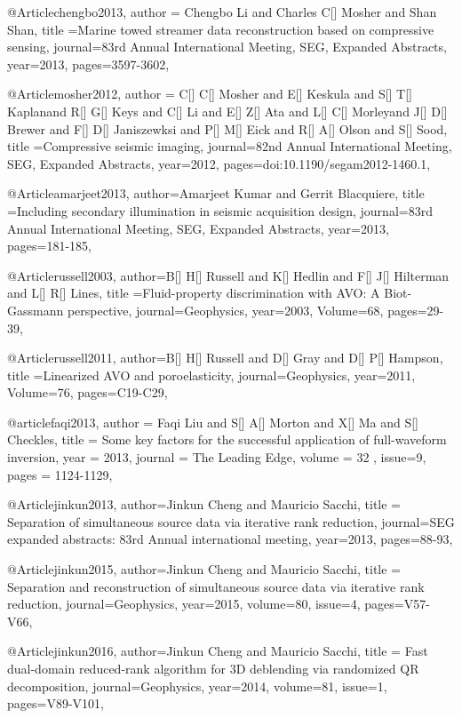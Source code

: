 {@Article{chengbo2013,
  author = {Chengbo Li and Charles C[] Mosher and Shan Shan},
  title ={Marine towed streamer data reconstruction based on compressive sensing},
  journal={83rd Annual International Meeting, SEG, Expanded Abstracts},
  year=2013,
  pages={3597-3602},
}

@Article{mosher2012,
  author = {C[] C[] Mosher and E[] Keskula and S[] T[] Kaplanand R[] G[] Keys and C[] Li and E[] Z[] Ata and L[] C[] Morleyand J[] D[] Brewer and F[] D[] Janiszewksi and P[] M[] Eick and R[] A[] Olson and S[] Sood},
  title ={Compressive seismic imaging},
  journal={82nd Annual International Meeting, SEG, Expanded Abstracts},
  year=2012,
  pages={doi:10.1190/segam2012-1460.1},
}


@Article{amarjeet2013,
  author={Amarjeet Kumar and Gerrit Blacquiere},
  title ={Including secondary illumination in seismic acquisition design},
  journal={83rd Annual International Meeting, SEG, Expanded Abstracts},
  year=2013,
  pages={181-185},
}

@Article{russell2003,
  author={B[] H[] Russell and K[] Hedlin and F[] J[] Hilterman and L[] R[] Lines},
  title ={Fluid-property discrimination with AVO: A Biot-Gassmann perspective},
  journal={Geophysics},
  year=2003,
  Volume=68,
  pages={29-39},
}

@Article{russell2011,
  author={B[] H[] Russell and D[] Gray and D[] P[] Hampson},
  title ={Linearized AVO and poroelasticity},
  journal={Geophysics},
  year=2011,
  Volume=76,
  pages={C19-C29},
}

@article{faqi2013,
  author =	 {Faqi Liu and S[] A[] Morton and X[] Ma and S[] Checkles},
  title =	 {Some key factors for the successful application of full-waveform inversion},
  year =	 2013,
  journal =	 {The Leading Edge},
  volume = 32	 ,
  issue=9,
  pages =	 {1124-1129},
}


@Article{jinkun2013,
  author={Jinkun Cheng and Mauricio Sacchi},
  title = {Separation of simultaneous source data via iterative rank reduction},
  journal={SEG expanded abstracts: 83rd Annual international meeting},
  year=2013,
  pages={88-93},
}

@Article{jinkun2015,
  author={Jinkun Cheng and Mauricio Sacchi},
  title = {Separation and reconstruction of simultaneous source data via iterative rank reduction},
  journal={Geophysics},
  year=2015,
  volume=80,
  issue=4,
  pages={V57-V66},
}

@Article{jinkun2016,
  author={Jinkun Cheng and Mauricio Sacchi},
  title = {Fast dual-domain reduced-rank algorithm for 3{D} deblending via randomized QR decomposition},
  journal={Geophysics},
  year=2014,
  volume=81,
  issue=1,
  pages={V89-V101},
}

}
